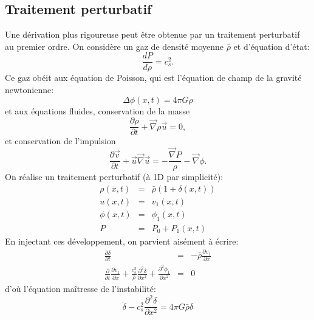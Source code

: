 \subsection{Traitement perturbatif}
Une dérivation plus rigoureuse peut être obtenue par un traitement perturbatif au premier ordre. On considère un gaz de densité moyenne $\bar \rho$ et d'équation d'état:
\begin{equation}
\frac{dP}{d\rho}=c_s^2.
\end{equation}
Ce gaz obéit aux équation de Poisson, qui est l'équation de champ de la gravité newtonienne:
\begin{equation}
\Delta \phi(x,t) = 4 \pi G \rho
\end{equation}
 et aux équations fluides, conservation de la masse
 \begin{equation}
 \frac{\partial \rho}{\partial t} + \vec \nabla \rho \vec u=0,
 \end{equation}
 et conservation de l'impulsion
 \begin{equation}
 \frac{\partial \vec v}{\partial t} +\vec u \vec \nabla \vec u = -\frac{\vec \nabla P}{\rho}-\vec \nabla \phi.
 \end{equation}
 On réalise un traitement perturbatif (à 1D par simplicité):
 \begin{eqnarray}
 \rho(x,t)&=&\bar \rho(1 +\delta(x,t))\\
 u(x,t)&=&v_1(x,t)\\
 \phi(x,t)&=&\phi_1(x,t)\\
 P&=&P_0+P_1(x,t)
 \end{eqnarray}
 En injectant ces développement, on parvient aisément à écrire:
 \begin{eqnarray}
 \frac{\partial \delta}{\partial t}&=&-\bar \rho \frac{\partial v_1}{\partial x}\\
 \frac{\partial}{\partial t}\frac{\partial v_1}{\partial x}+\frac{c_s^2}{\bar \rho}\frac{\partial^2 \delta}{\partial x^2}+\frac{\partial^2 \phi_1}{\partial x^2}&=&0
 \end{eqnarray}
 d'où l'équation maîtresse de l'instabilité:
 \begin{equation}
 \ddot \delta -c_s ^2\frac{\partial^2 \delta}{\partial x^2}=4\pi G \bar \rho \delta
 \end{equation}
